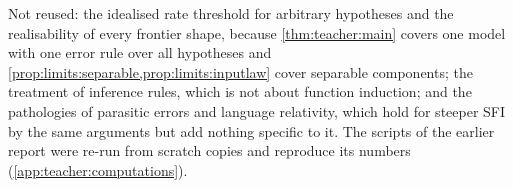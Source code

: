 Not reused: the idealised rate threshold for arbitrary hypotheses and the realisability of every frontier shape, because \cref{thm:teacher:main} covers one model with one error rule over all hypotheses and \cref{prop:limits:separable,prop:limits:inputlaw} cover separable components; the treatment of inference rules, which is not about function induction; and the pathologies of parasitic errors and language relativity, which hold for steeper SFI by the same arguments but add nothing specific to it. The scripts of the earlier report were re-run from scratch copies and reproduce its numbers (\cref{app:teacher:computations}).
